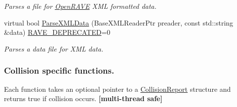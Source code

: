 \begin{DoxyCompactItemize}
\begin{DoxyCompactList}\small\item\em Parses a file for \hyperlink{namespaceOpenRAVE}{OpenRAVE} XML formatted data. \item\end{DoxyCompactList}\item 
virtual bool \hyperlink{classOpenRAVE_1_1EnvironmentBase_a9895152450985d0a439b851d8ec78d7f}{ParseXMLData} (BaseXMLReaderPtr preader, const std::string \&data) \hyperlink{classOpenRAVE_1_1EnvironmentBase_acb298cf75a95a9dcfdc2bfccd7321413}{RAVE\_\-DEPRECATED}=0
\begin{DoxyCompactList}\small\item\em Parses a data file for XML data. \item\end{DoxyCompactList}\end{DoxyCompactItemize}
\subsubsection*{Collision specific functions.}
\label{_amgrpef0faa32f592cc67b0a4ecf86076aa0d}
Each function takes an optional pointer to a \hyperlink{classOpenRAVE_1_1CollisionReport}{CollisionReport} structure and returns true if collision occurs. {\bfseries \mbox{[}multi-\/thread safe\mbox{]}}

